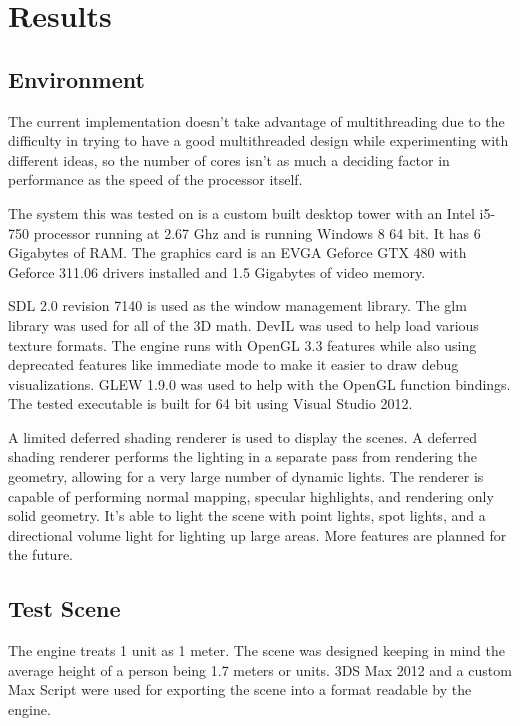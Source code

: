 \documentclass[12pt]{ucthesis}
\begin{document}
\chapter{Results}
\label{results}

\section{Environment}
\label{environment}

The current implementation doesn't take advantage of multithreading due to the difficulty in trying to have a good multithreaded design while experimenting with different ideas, so the number of cores isn't as much a deciding factor in performance as the speed of the processor itself.

The system this was tested on is a custom built desktop tower with an Intel i5-750 processor running at 2.67 Ghz and is running Windows 8 64 bit.
It has 6 Gigabytes of RAM.
The graphics card is an EVGA Geforce GTX 480 with Geforce 311.06 drivers installed and 1.5 Gigabytes of video memory.

SDL 2.0 revision 7140 is used as the window management library.
The glm library was used for all of the 3D math.
DevIL was used to help load various texture formats.
The engine runs with OpenGL 3.3 features while also using deprecated features like immediate mode to make it easier to draw debug visualizations.
GLEW 1.9.0 was used to help with the OpenGL function bindings.
The tested executable is built for 64 bit using Visual Studio 2012.

A limited deferred shading renderer is used to display the scenes.
A deferred shading renderer performs the lighting in a separate pass from rendering the geometry, allowing for a very large number of dynamic lights.
The renderer is capable of performing normal mapping, specular highlights, and rendering only solid geometry.
It's able to light the scene with point lights, spot lights, and a directional volume light for lighting up large areas.
More features are planned for the future.

\section{Test Scene}
\label{test-scene}

The engine treats 1 unit as 1 meter.
The scene was designed keeping in mind the average height of a person being 1.7 meters or units.
3DS Max 2012 and a custom Max Script were used for exporting the scene into a format readable by the engine.
\end{document}
